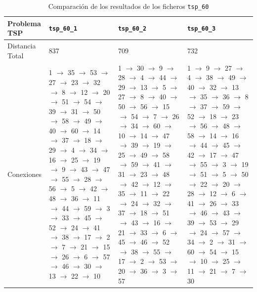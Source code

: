 \documentclass[a4paper,11pt]{article}
\begin{document}
\begin{table}[!htbp]
\label{results_tsp_60}
\centering
\begin{tabularx}{\textwidth}{|p{2cm}|X|X|X|}
\hline
Problema TSP    & \texttt{tsp\_60\_1}   & \texttt{tsp\_60\_2}   & \texttt{tsp\_60\_3}	\\ \hline
Distancia Total & 837	& 709	& 732	\\ \hline
Conexiones    & 1 $\to$ 35 $\to$ 53 $\to$ 27 $\to$ 23 $\to$ 32 $\to$ 8 $\to$ 12 $\to$ 20 $\to$ 51 $\to$ 54 $\to$ 39 $\to$ 31 $\to$ 50 $\to$ 58 $\to$ 49 $\to$ 40 $\to$ 60 $\to$ 14 $\to$ 37 $\to$ 18 $\to$ 29 $\to$ 4 $\to$ 34 $\to$ 16 $\to$ 25 $\to$ 19 $\to$ 9 $\to$ 43 $\to$ 47 $\to$ 55 $\to$ 28 $\to$ 56 $\to$ 5 $\to$ 42 $\to$ 48 $\to$ 36 $\to$ 11 $\to$ 44 $\to$ 59 $\to$ 3 $\to$ 33 $\to$ 45 $\to$ 52 $\to$ 24 $\to$ 41 $\to$ 38 $\to$ 17 $\to$ 2 $\to$ 7 $\to$ 21 $\to$ 15 $\to$ 26 $\to$ 6 $\to$ 57 $\to$ 46 $\to$ 30 $\to$ 13 $\to$ 22 $\to$ 10	& 1 $\to$ 30 $\to$ 9 $\to$ 28 $\to$ 4 $\to$ 44 $\to$ 29 $\to$ 13 $\to$ 5 $\to$ 27 $\to$ 8 $\to$ 40 $\to$ 50 $\to$ 56 $\to$ 15 $\to$ 54 $\to$ 7 $\to$ 26 $\to$ 34 $\to$ 60 $\to$ 10 $\to$ 14 $\to$ 47 $\to$ 39 $\to$ 19 $\to$ 25 $\to$ 49 $\to$ 58 $\to$ 59 $\to$ 41 $\to$ 31 $\to$ 23 $\to$ 48 $\to$ 42 $\to$ 12 $\to$ 35 $\to$ 11 $\to$ 22 $\to$ 24 $\to$ 32 $\to$ 37 $\to$ 18 $\to$ 51 $\to$ 43 $\to$ 16 $\to$ 21 $\to$ 33 $\to$ 6 $\to$ 45 $\to$ 46 $\to$ 52 $\to$ 38 $\to$ 55 $\to$ 17 $\to$ 2 $\to$ 53 $\to$ 20 $\to$ 36 $\to$ 3 $\to$ 57	& 1 $\to$ 9 $\to$ 27 $\to$ 4 $\to$ 38 $\to$ 49 $\to$ 40 $\to$ 32 $\to$ 13 $\to$ 35 $\to$ 36 $\to$ 8 $\to$ 37 $\to$ 59 $\to$ 52 $\to$ 18 $\to$ 23 $\to$ 56 $\to$ 48 $\to$ 58 $\to$ 14 $\to$ 16 $\to$ 44 $\to$ 45 $\to$ 42 $\to$ 17 $\to$ 47 $\to$ 55 $\to$ 3 $\to$ 19 $\to$ 51 $\to$ 5 $\to$ 50 $\to$ 22 $\to$ 20 $\to$ 28 $\to$ 12 $\to$ 6 $\to$ 41 $\to$ 26 $\to$ 33 $\to$ 46 $\to$ 43 $\to$ 39 $\to$ 53 $\to$ 29 $\to$ 24 $\to$ 57 $\to$ 34 $\to$ 2 $\to$ 31 $\to$ 60 $\to$ 54 $\to$ 15 $\to$ 10 $\to$ 25 $\to$ 11 $\to$ 21 $\to$ 7 $\to$ 30	\\ \hline
\end{tabularx}
\caption{Comparación de los resultados de los ficheros \texttt{tsp\_60}}
\end{table}
\end{document}
